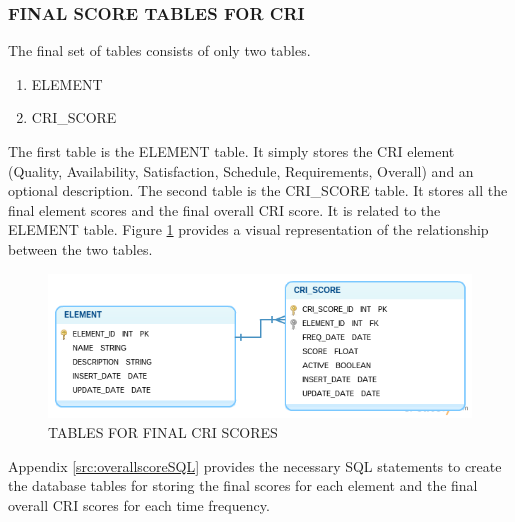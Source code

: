 \documentclass[SDSUThesis.tex]{subfiles}
\begin{document}
        \subsubsection{FINAL SCORE TABLES FOR CRI}
            The final set of tables consists of only two tables.  
            \begin{enumerate}
                \item ELEMENT
                \item CRI\_SCORE
            \end{enumerate}
            The first
            table is the ELEMENT table.  It simply stores the CRI element 
            (Quality, Availability, Satisfaction, Schedule, Requirements, Overall) and 
            an optional description. The second table is the CRI\_SCORE table.  
            It stores all the final element scores and the final overall CRI
            score.  It is related to the ELEMENT table.  Figure 
            \ref{fig:final_score_tables} provides a visual representation of the 
            relationship between the two tables. 
            
           \begin{figure}[hbt]
                \centering
                \includegraphics[scale=.52]{images/final_score_tables.png}
                \caption{TABLES FOR FINAL CRI SCORES}
                \label{fig:final_score_tables}
            \end{figure}
            
            
            Appendix \ref{src:overallscoreSQL} provides the necessary SQL 
            statements to create the 
            database tables for storing the final scores for each element and the final 
            overall CRI scores for each time frequency.
\end{document}
